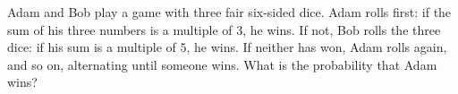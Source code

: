 Adam and Bob play a game with three fair six-sided dice. Adam rolls first: if the sum of his three numbers is a multiple of $3$, he wins. If not, Bob rolls the three dice: if his sum is a multiple of $5$, he wins. If neither has won, Adam rolls again, and so on, alternating until someone wins. What is the probability that Adam wins?
